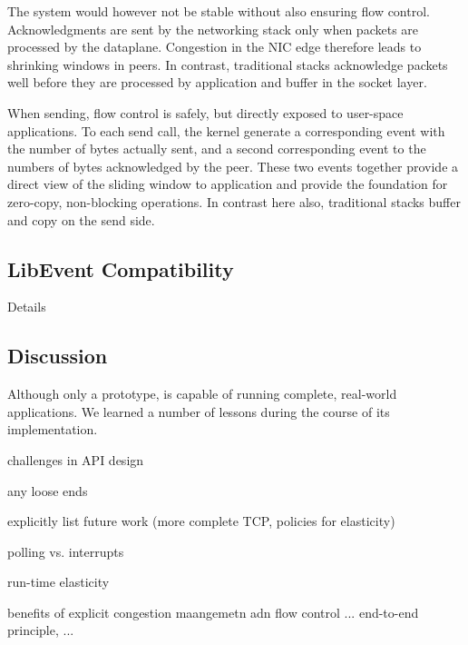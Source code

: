 The system would however not be stable without also ensuring flow
control.  Acknowledgments are sent by the networking stack only when
packets are processed by the dataplane.  Congestion in the NIC edge
therefore leads to shrinking windows in peers.  In contrast, traditional stacks
acknowledge packets well before they are processed by application and
buffer in the socket layer.

When sending, flow control is safely, but directly exposed to
user-space applications.  To each send call, the \ix kernel generate a
corresponding event with the number of bytes actually sent, and a
second corresponding event to the numbers of bytes acknowledged by
the peer.  These two events together provide a direct view of the
sliding window to application and provide the foundation for zero-copy,
non-blocking operations.  In contrast here also, traditional stacks
buffer and copy on the send side.


\subsection{LibEvent Compatibility}
\label{sec:impl:libix}
\todo Details 

\subsection{Discussion}
\label{sec:impl:discussion}

Although only a prototype, \ix is capable of running complete,
real-world applications.  We learned a number of lessons during the
course of its implementation.

\todo challenges in API design

\todo any loose ends

\todo explicitly list future work (more complete TCP, policies for elasticity)

\todo polling vs. interrupts

\todo run-time elasticity

\todo benefits of explicit congestion maangemetn adn flow control ... end-to-end principle, ... 


